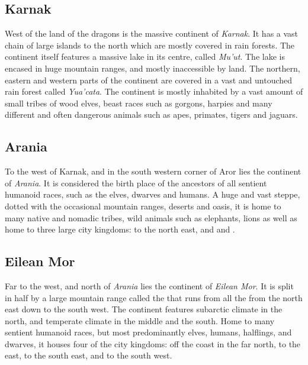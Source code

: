 \subsection{Karnak}

West of the land of the dragons is the massive continent of \emph{Karnak}. It
has a vast chain of large islands to the north which are mostly covered in
rain forests. The continent itself features a massive lake in its centre,
called \emph{Mu'ut}. The lake is encased in huge mountain ranges, and mostly
inaccessible by land. The northern, eastern and western parts of the continent
are covered in a vast and untouched rain forest called \emph{Yua'cata}. The
continent is mostly inhabited by a vast amount of small tribes of wood elves,
beast races such as gorgons, harpies and many different and often dangerous
animals such as apes, primates, tigers and jaguars.

\subsection{Arania}
\label{sec:Arania}

To the west of Karnak, and in the south western corner of Aror lies the
continent of \emph{Arania}. It is considered the birth place of the ancestors
of all sentient humanoid races, such as the elves, dwarves and humans. A huge
and vast steppe, dotted with the occasional mountain ranges, deserts and oasis,
it is home to many native and nomadic tribes, wild animals such as elephants,
lions as well as home to three large city kingdoms:  to the north east, and  and
.

\subsection{Eilean Mor}
\label{sec:Eilean Mor}

Far to the west, and north of \emph{Arania} lies the continent of \emph{Eilean
  Mor}. It is split in half by a large mountain range called the
 that runs from all the from the north east down to
the south west.  The continent features subarctic climate in the north, and
temperate climate in the middle and the south. Home to many sentient humanoid
races, but most predominantly elves, humans, halflings, and dwarves, it houses
four of the city kingdoms:  off the coast in the far
north,  to the east,  to the
south east, and  to the south west.

